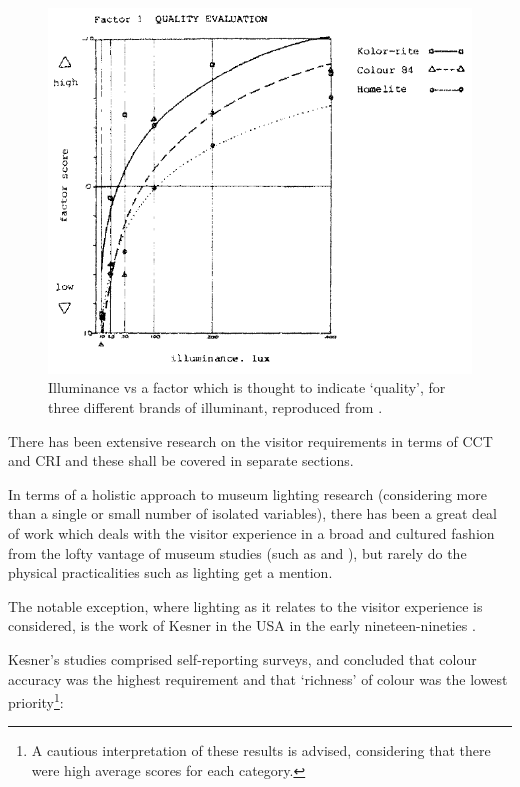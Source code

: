 \begin{figure}[htbp]
\includegraphics[max width=\textwidth]{figs/LitRev/Loe.png}
\caption{Illuminance vs a factor which is thought to indicate `quality', for three different brands of illuminant, reproduced from \citet{loe_preferred_1982}.}
\label{fig:Loe}
\end{figure}

There has been extensive research on the visitor requirements in terms of \gls{CCT} and \gls{CRI} and these shall be covered in separate sections.

In terms of a holistic approach to museum lighting research (considering more than a single or small number of isolated variables), there has been a great deal of work which deals with the visitor experience in a broad and cultured fashion from the lofty vantage of museum studies (such as \citet{falk_museum_2016} and \citet{shapiro_museum_1990}), but rarely do the physical practicalities such as lighting get a mention. 

The notable exception, where lighting as it relates to the visitor experience is considered, is the work of Kesner in the USA in the early nineteen-nineties \citep{kesner_museum_1993-1,kesner_museum_1993,kesner_exhibition_1992,kesner_current_1991,kesner_analysis_1997}.

Kesner's studies comprised self-reporting surveys, and concluded that colour accuracy was the highest requirement and that `richness' of colour was the lowest priority\footnote{A cautious interpretation of these results is advised, considering that there were high average scores for each category.}:

